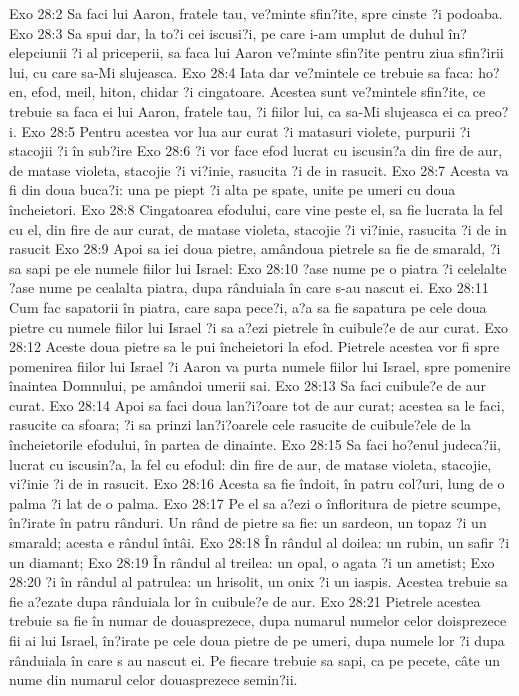 Exo 28:2  Sa faci lui Aaron, fratele tau, ve?minte sfin?ite, spre cinste ?i podoaba.
Exo 28:3  Sa spui dar, la to?i cei iscusi?i, pe care i-am umplut de duhul în?elepciunii ?i al priceperii, sa faca lui Aaron ve?minte sfin?ite pentru ziua sfin?irii lui, cu care sa-Mi slujeasca.
Exo 28:4  Iata dar ve?mintele ce trebuie sa faca: ho?en, efod, meil, hiton, chidar ?i cingatoare. Acestea sunt ve?mintele sfin?ite, ce trebuie sa faca ei lui Aaron, fratele tau, ?i fiilor lui, ca sa-Mi slujeasca ei ca preo?i.
Exo 28:5  Pentru acestea vor lua aur curat ?i matasuri violete, purpurii ?i stacojii ?i în sub?ire
Exo 28:6  ?i vor face efod lucrat cu iscusin?a din fire de aur, de matase violeta, stacojie ?i vi?inie, rasucita ?i de in rasucit.
Exo 28:7  Acesta va fi din doua buca?i: una pe piept ?i alta pe spate, unite pe umeri cu doua încheietori.
Exo 28:8  Cingatoarea efodului, care vine peste el, sa fie lucrata la fel cu el, din fire de aur curat, de matase violeta, stacojie ?i vi?inie, rasucita ?i de in rasucit
Exo 28:9  Apoi sa iei doua pietre, amândoua pietrele sa fie de smarald, ?i sa sapi pe ele numele fiilor lui Israel:
Exo 28:10  ?ase nume pe o piatra ?i celelalte ?ase nume pe cealalta piatra, dupa rânduiala în care s-au nascut ei.
Exo 28:11  Cum fac sapatorii în piatra, care sapa pece?i, a?a sa fie sapatura pe cele doua pietre cu numele fiilor lui Israel ?i sa a?ezi pietrele în cuibule?e de aur curat.
Exo 28:12  Aceste doua pietre sa le pui încheietori la efod. Pietrele acestea vor fi spre pomenirea fiilor lui Israel ?i Aaron va purta numele fiilor lui Israel, spre pomenire înaintea Domnului, pe amândoi umerii sai.
Exo 28:13  Sa faci cuibule?e de aur curat.
Exo 28:14  Apoi sa faci doua lan?i?oare tot de aur curat; acestea sa le faci, rasucite ca sfoara; ?i sa prinzi lan?i?oarele cele rasucite de cuibule?ele de la încheietorile efodului, în partea de dinainte.
Exo 28:15  Sa faci ho?enul judeca?ii, lucrat cu iscusin?a, la fel cu efodul: din fire de aur, de matase violeta, stacojie, vi?inie ?i de in rasucit.
Exo 28:16  Acesta sa fie îndoit, în patru col?uri, lung de o palma ?i lat de o palma.
Exo 28:17  Pe el sa a?ezi o înfloritura de pietre scumpe, în?irate în patru rânduri. Un rând de pietre sa fie: un sardeon, un topaz ?i un smarald; acesta e rândul întâi.
Exo 28:18  În rândul al doilea: un rubin, un safir ?i un diamant;
Exo 28:19  În rândul al treilea: un opal, o agata ?i un ametist;
Exo 28:20  ?i în rândul al patrulea: un hrisolit, un onix ?i un iaspis. Acestea trebuie sa fie a?ezate dupa rânduiala lor în cuibule?e de aur.
Exo 28:21  Pietrele acestea trebuie sa fie în numar de douasprezece, dupa numarul numelor celor doisprezece fii ai lui Israel, în?irate pe cele doua pietre de pe umeri, dupa numele lor ?i dupa rânduiala în care s au nascut ei. Pe fiecare trebuie sa sapi, ca pe pecete, câte un nume din numarul celor douasprezece semin?ii.

